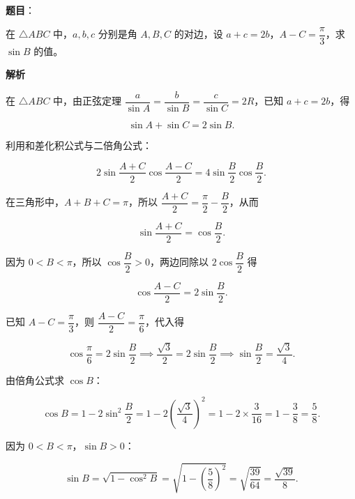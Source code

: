 \begin{answer}

\textbf{题目}：

在 $\triangle ABC$ 中，$a,b,c$ 分别是角 $A,B,C$ 的对边，设 $a+c=2b$，$A-C=\dfrac\pi3$，求 $\sin B$ 的值。

\textbf{解析}

在 $\triangle ABC$ 中，由正弦定理 $\dfrac{a}{\sin A} = \dfrac{b}{\sin B} = \dfrac{c}{\sin C} = 2R$，已知 $a+c=2b$，得

\nopagebreak[4]
\[
\sin A + \sin C = 2\sin B.
\]

利用和差化积公式与二倍角公式：

\nopagebreak[4]
\[
2\sin\frac{A+C}{2}\cos\frac{A-C}{2} = 4\sin\frac{B}{2}\cos\frac{B}{2}.
\]

在三角形中，$A+B+C=\pi$，所以 $\dfrac{A+C}{2} = \dfrac\pi2 - \dfrac{B}{2}$，从而

\nopagebreak[4]
\[
\sin\frac{A+C}{2} = \cos\frac{B}{2}.
\]

因为 $0 < B < \pi$，所以 $\cos\dfrac{B}{2} > 0$，两边同除以 $2\cos\dfrac{B}{2}$ 得

\nopagebreak[4]
\[
\cos\frac{A-C}{2} = 2\sin\frac{B}{2}.
\]

已知 $A-C = \dfrac\pi3$，则 $\dfrac{A-C}{2} = \dfrac\pi6$，代入得

\nopagebreak[4]
\[
\cos\frac\pi6 = 2\sin\frac{B}{2} \implies \frac{\sqrt3}{2} = 2\sin\frac{B}{2} \implies \sin\frac{B}{2} = \frac{\sqrt3}{4}.
\]

由倍角公式求 $\cos B$：

\nopagebreak[4]
\[
\cos B = 1 - 2\sin^2\frac{B}{2} = 1 - 2\left(\frac{\sqrt3}{4}\right)^2 = 1 - 2\times\frac{3}{16} = 1 - \frac38 = \frac58.
\]

因为 $0 < B < \pi$，$\sin B > 0$：

\nopagebreak[4]
\[
\sin B = \sqrt{1 - \cos^2 B} = \sqrt{1 - \left(\frac58\right)^2} = \sqrt{\frac{39}{64}} = \frac{\sqrt{39}}{8}.
\]


\end{answer}

